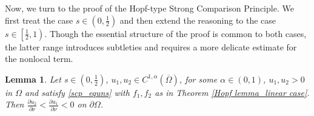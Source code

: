 \documentclass[reqno,oneside]{amsart}
\newtheorem{lemma}[theorem]{Lemma}
\theoremstyle{definition}
\theoremstyle{remark}
\numberwithin{equation}{section}
\newcommand{\Om} {\Omega}
\newcommand{\pa}{\partial}
\begin{document}
Now, we turn to the proof of the Hopf-type Strong Comparison Principle. We first treat the case $s\in \left(0, \frac{1}{2}\right)$ and then extend the reasoning to the case $s\in \left[\frac{1}{2}, 1\right)$. Though the essential structure of the proof is common to both cases, the latter range introduces subtleties and requires a more delicate estimate for the nonlocal term.

\begin{lemma}\label{hopf_first}
    Let $s \in \left(0, \frac{1}{2}\right)$, $u_1, u_2 \in C^{1,\alpha}(\overline{\Om})$, for some $\alpha\in(0,1)$, $u_1, u_2 > 0$ in $\Om$ and satisfy \eqref{scp_equns} with $f_1, f_2$ as in Theorem \ref{Hopf lemma_linear case}. Then $\frac{\pa u_2}{\pa\nu} < \frac{\pa u_1}{\pa\nu} < 0$ on $\pa\Om$.
\end{lemma}
\end{document}
